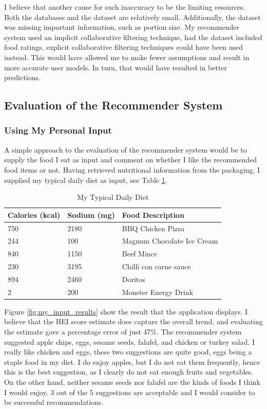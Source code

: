 \documentclass{article}
\begin{document}
\bigskip
\noindent I believe that another cause for such inaccuracy to be the limiting resources. Both the databases and the dataset are relatively small. Additionally, the dataset was missing important information, such as portion size. My recommender system used an implicit collaborative filtering technique, had the dataset included food ratings, explicit collaborative filtering techniques could have been used instead. This would have allowed me to make fewer assumptions and result in more accurate user models. In turn, that would have resulted in better predictions. 

\subsection{Evaluation of the Recommender System}
\subsubsection{Using My Personal Input}
A simple approach to the evaluation of the recommender system would be to supply the food I eat as input and comment on whether I like the recommended food items or not. Having retrieved nutritional information from the packaging, I supplied my typical daily diet as input, see Table \ref{table:my_typical_input}.

\begin{table}[h]
\centering
\hspace*{-0.25cm}
\begin{tabular}{||m{2cm}|m{2cm}|m{5cm}||}
\hline
    Calories (kcal) & Sodium (mg) &  Food Description\\ 
    \hline
    750 & 2180 & BBQ Chicken Pizza\\
    \hline
    244 & 100 & Magnum Chocolate Ice Cream\\
    \hline
    840 & 1150 & Beef Mince\\
    \hline
    230 & 3195 & Chilli con carne sauce\\
    \hline
    894 & 2460 & Doritos\\
    \hline 
    2 & 200 & Monster Energy Drink\\
\hline
\end{tabular}
\caption{My Typical Daily Diet}
\label{table:my_typical_input}
\end{table}

\noindent Figure \ref{fig:my_input_results} show the result that the application displays. I believe that the HEI score estimate does capture the overall trend, and evaluating the estimate gave a percentage error of just 47\%. The recommender system suggested apple chips, eggs, sesame seeds, falafel, and chicken or turkey salad. I really like chicken and eggs, these two suggestions are quite good, eggs being a staple food in my diet. I do enjoy apples, but I do not eat them frequently, hence this is the best suggestion, as I clearly do not eat enough fruits and vegetables. On the other hand, neither sesame seeds nor falafel are the kinds of foods I think I would enjoy. 3 out of the 5 suggestions are acceptable and I would consider to be successful recommendations.
\end{document}
